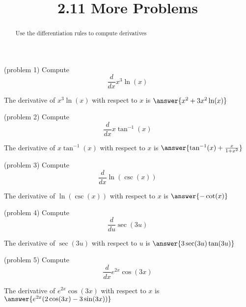 \documentclass[handout]{ximera}
\title{2.11 More Problems}
\begin{document}
\begin{abstract}
Use the differentiation rules to compute derivatives
\end{abstract}

\maketitle








\begin{problem}(problem 1)
  Compute
  \[
  \frac{d}{dx}x^3\ln(x)
  \]
  
    
    
		The derivative of $x^3\ln (x)$ with respect to $x$ is
		 $\answer{x^2 + 3x^2\ln(x)}$
		
\end{problem}





\begin{problem}(problem 2)
  Compute
  \[
  \frac{d}{dx} x \tan^{-1} (x)
  \]
  
    
    
		The derivative of $x \tan^{-1} (x)$ with respect to $x$ is
		 $\answer{\tan^{-1}(x) + \frac{x}{1+x^2}}$
		
\end{problem}



\begin{problem}(problem 3)
  Compute
  \[
  \frac{d}{dx} \ln(\csc (x))
  \]
  
    
    
		The derivative of $\ln(\csc (x))$ with respect to $x$ is
		 $\answer{-\cot(x)}$
		
\end{problem}



\begin{problem}(problem 4)
  Compute
  \[
  \frac{d}{du} \sec(3u)
  \]
  
    
    
		The derivative of $\sec(3u)$ with respect to $u$ is
		 $\answer{3\sec(3u)\tan(3u)}$
		
\end{problem}


\begin{problem}(problem 5)
  Compute
  \[
  \frac{d}{dx} e^{2x} \cos(3x)
  \]
  
   
    
		The derivative of $e^{2x} \cos(3x)$ with respect to $x$ is
		 $\answer{e^{2x}(2\cos(3x)-3\sin(3x))}$
		
\end{problem}
\end{document}
